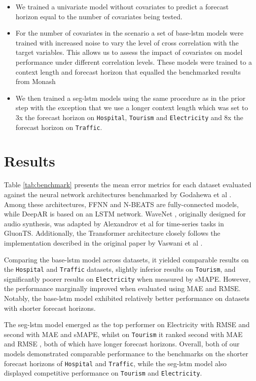 \documentclass{article}
\begin{document}
\begin{itemize}
  \item We trained a univariate model without covariates to predict a forecast horizon equal to the number of covariates being 
  tested.
  \item For the number of covariates in the scenario a set of base-lstm models were trained with increased noise to vary the 
  level of cross correlation with the target variables.  This allows us to assess the impact of covariates on model performance under 
  different correlation levels. These models were trained to a context length and forecast horizon that equalled the benchmarked 
  results from Monash \cite{DBLP:conf/nips/GodahewaBWHM21}
 \item We then trained a seg-lstm models using the same procedure as in the prior step with the exception that we use a longer context 
 length which was set to 3x the forecast horizon on \texttt{Hospital}, \texttt{Tourism} and \texttt{Electricity} and 8x the forecast horizon on \texttt{Traffic}. 
\end{itemize}

\section{Results}
Table \ref{tab:benchmark} presents the mean error metrics for each dataset evaluated against the neural network architectures benchmarked 
by Godahewa et al \cite{DBLP:conf/nips/GodahewaBWHM21}. Among these architectures, FFNN and N-BEATS \cite{oreshkin2020nbeats} are fully-connected models, 
while DeepAR \cite{salinas2019deepar} is based on an LSTM network. WaveNet \cite{oord2016wavenet}, originally designed for 
audio synthesis, was adapted by Alexandrov et al \cite{gluonts_arxiv} for time-series tasks in GluonTS. Additionally, the Transformer 
architecture closely follows the implementation described in the original paper by Vaswani et al \cite{vaswani2023attention}.

Comparing the base-lstm model across datasets, it yielded comparable results on the \texttt{Hospital} and \texttt{Traffic} datasets, 
slightly inferior results on \texttt{Tourism}, and significantly poorer results on \texttt{Electricity} when measured by sMAPE. However, 
the performance marginally improved when evaluated using MAE and RMSE. Notably, the base-lstm model exhibited relatively better performance on datasets with shorter forecast horizons.

The seg-lstm model emerged as the top performer on Electricity with RMSE and second with MAE and sMAPE, whilst on \texttt{Tourism} it ranked second  
with MAE and RMSE , both of which have longer forecast horizons. Overall, both of our models demonstrated comparable performance to the benchmarks on the shorter forecast 
horizons of \texttt{Hospital} and \texttt{Traffic}, while the seg-lstm model also displayed competitive performance on \texttt{Tourism} 
and \texttt{Electricity}.
\end{document}

